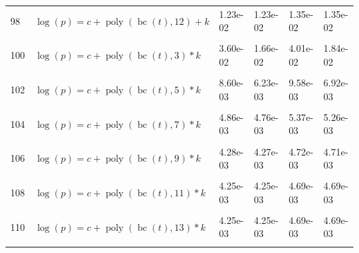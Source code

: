 \documentclass[12pt,a4paper]{article}
\DeclareMathOperator{\bc}{bc}
\DeclareMathOperator{\poly}{poly}
\begin{document}
\begin{longtable}[t]{ll>{\raggedleft\arraybackslash}p{2cm}>{\raggedleft\arraybackslash}p{2cm}>{\raggedleft\arraybackslash}p{2cm}>{\raggedleft\arraybackslash}p{2cm}}
98 & $\log(p) = c + \poly\left( \bc(t), 12 \right) + k$ & 1.23e-02 & 1.23e-02 & 1.35e-02 & 1.35e-02\\
\cellcolor{gray!6}{99} & \cellcolor{gray!6}{$\log(p) = c + \poly\left( \bc(t), 13 \right) + k$} & \cellcolor{gray!6}{1.23e-02} & \cellcolor{gray!6}{1.23e-02} & \cellcolor{gray!6}{1.35e-02} & \cellcolor{gray!6}{1.35e-02}\\
100 & $\log(p) = c + \poly\left( \bc(t), 3 \right) * k$ & 3.60e-02 & 1.66e-02 & 4.01e-02 & 1.84e-02\\
\cellcolor{gray!6}{101} & \cellcolor{gray!6}{$\log(p) = c + \poly\left( \bc(t), 4 \right) * k$} & \cellcolor{gray!6}{1.92e-02} & \cellcolor{gray!6}{1.91e-02} & \cellcolor{gray!6}{2.14e-02} & \cellcolor{gray!6}{2.13e-02}\\
102 & $\log(p) = c + \poly\left( \bc(t), 5 \right) * k$ & 8.60e-03 & 6.23e-03 & 9.58e-03 & 6.92e-03\\
\cellcolor{gray!6}{103} & \cellcolor{gray!6}{$\log(p) = c + \poly\left( \bc(t), 6 \right) * k$} & \cellcolor{gray!6}{4.39e-03} & \cellcolor{gray!6}{4.33e-03} & \cellcolor{gray!6}{4.85e-03} & \cellcolor{gray!6}{4.78e-03}\\
104 & $\log(p) = c + \poly\left( \bc(t), 7 \right) * k$ & 4.86e-03 & 4.76e-03 & 5.37e-03 & 5.26e-03\\
\cellcolor{gray!6}{105} & \cellcolor{gray!6}{$\log(p) = c + \poly\left( \bc(t), 8 \right) * k$} & \cellcolor{gray!6}{4.36e-03} & \cellcolor{gray!6}{4.31e-03} & \cellcolor{gray!6}{4.81e-03} & \cellcolor{gray!6}{4.75e-03}\\
106 & $\log(p) = c + \poly\left( \bc(t), 9 \right) * k$ & 4.28e-03 & 4.27e-03 & 4.72e-03 & 4.71e-03\\
\cellcolor{gray!6}{107} & \cellcolor{gray!6}{$\log(p) = c + \poly\left( \bc(t), 10 \right) * k$} & \cellcolor{gray!6}{4.26e-03} & \cellcolor{gray!6}{4.26e-03} & \cellcolor{gray!6}{4.70e-03} & \cellcolor{gray!6}{4.70e-03}\\
108 & $\log(p) = c + \poly\left( \bc(t), 11 \right) * k$ & 4.25e-03 & 4.25e-03 & 4.69e-03 & 4.69e-03\\
\cellcolor{gray!6}{109} & \cellcolor{gray!6}{$\log(p) = c + \poly\left( \bc(t), 12 \right) * k$} & \cellcolor{gray!6}{4.25e-03} & \cellcolor{gray!6}{4.25e-03} & \cellcolor{gray!6}{4.69e-03} & \cellcolor{gray!6}{4.69e-03}\\
110 & $\log(p) = c + \poly\left( \bc(t), 13 \right) * k$ & 4.25e-03 & 4.25e-03 & 4.69e-03 & 4.69e-03\\
\cellcolor{gray!6}{111} & \cellcolor{gray!6}{$\log(p) = c + \poly\left( \bc(t), 3 \right) + \log(k)$} & \cellcolor{gray!6}{3.65e-02} & \cellcolor{gray!6}{2.03e-02} & \cellcolor{gray!6}{4.06e-02} & \cellcolor{gray!6}{2.24e-02}\\

\end{longtable}
\end{document}
